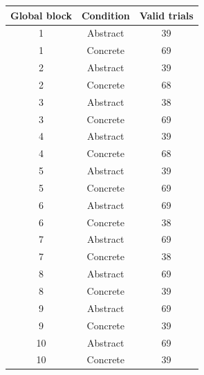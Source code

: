 \begin{tabular}{ccc}
\toprule
Global block & Condition & Valid trials\\
\midrule
1 & Abstract & 39\\
1 & Concrete & 69\\
2 & Abstract & 39\\
2 & Concrete & 68\\
3 & Abstract & 38\\
3 & Concrete & 69\\
4 & Abstract & 39\\
4 & Concrete & 68\\
5 & Abstract & 39\\
5 & Concrete & 69\\
6 & Abstract & 69\\
6 & Concrete & 38\\
7 & Abstract & 69\\
7 & Concrete & 38\\
8 & Abstract & 69\\
8 & Concrete & 39\\
9 & Abstract & 69\\
9 & Concrete & 39\\
10 & Abstract & 69\\
10 & Concrete & 39\\
\bottomrule
\end{tabular}
